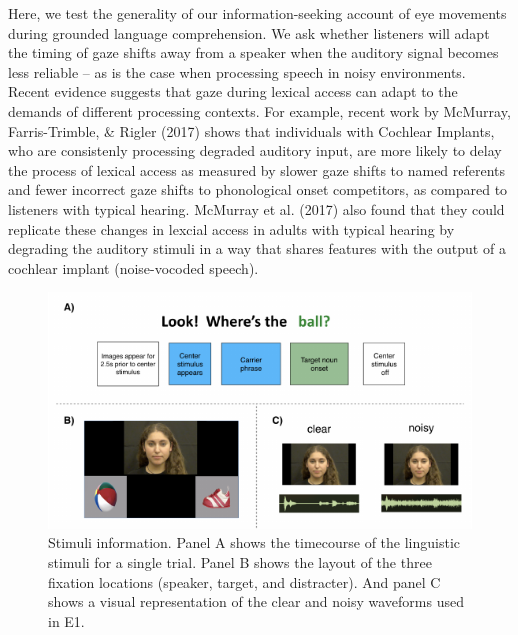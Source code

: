 \documentclass[10pt, letterpaper]{article}
\newenvironment{CodeChunk}{}{}
\begin{document}
Here, we test the generality of our information-seeking account of eye
movements during grounded language comprehension. We ask whether
listeners will adapt the timing of gaze shifts away from a speaker when
the auditory signal becomes less reliable -- as is the case when
processing speech in noisy environments. Recent evidence suggests that
gaze during lexical access can adapt to the demands of different
processing contexts. For example, recent work by McMurray,
Farris-Trimble, \& Rigler (2017) shows that individuals with Cochlear
Implants, who are consistenly processing degraded auditory input, are
more likely to delay the process of lexical access as measured by slower
gaze shifts to named referents and fewer incorrect gaze shifts to
phonological onset competitors, as compared to listeners with typical
hearing. McMurray et al. (2017) also found that they could replicate
these changes in lexcial access in adults with typical hearing by
degrading the auditory stimuli in a way that shares features with the
output of a cochlear implant (noise-vocoded speech).

\begin{CodeChunk}
\begin{figure}[tb]

{\centering \includegraphics[width=0.7\linewidth]{figs/stimuli_plot-1} 

}

\caption[Stimuli information]{Stimuli information. Panel A shows the timecourse of the linguistic stimuli for a single trial. Panel B shows the layout of the three fixation locations (speaker, target, and distracter). And panel C shows a visual representation of the clear and noisy waveforms used in E1.}\label{fig:stimuli_plot}
\end{figure}
\end{CodeChunk}
\end{document}
